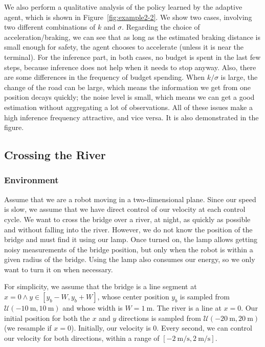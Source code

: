 We also perform a qualitative analysis of the policy learned by the adaptive agent, which is shown in Figure~\ref{fig:example2-2}. We show two cases, involving two different combinations of $k$ and $\sigma$. Regarding the choice of acceleration/braking, we can see that as long as the estimated braking distance is small enough for safety, the agent chooses to accelerate (unless it is near the terminal). For the inference part, in both cases, no budget is spent in the last few steps, because inference does not help when it needs to stop anyway. Also, there are some differences in the frequency of budget spending. When $k/\sigma$ is large, the change of the road can be large, which means the information we get from one position decays quickly; the noise level is small, which means we can get a good estimation without aggregating a lot of observations. All of these issues make a high inference frequency attractive, and vice versa. It is also demonstrated in the figure.

\subsection{Crossing the River}\label{ap:crossing-river}

\subsubsection{Environment} Assume that we are a robot moving in a two-dimensional plane. Since our speed is slow, we assume that we have direct control of our velocity at each control cycle. We want to cross the bridge over a river, at night, as quickly as possible and without falling into the river. However, we do not know the position of the bridge and must find it using our lamp. Once turned on, the lamp allows getting noisy measurements of the bridge position, but only when the robot is within a given radius of the bridge. Using the lamp also consumes our energy, so we only want to turn it on when necessary.

For simplicity, we assume that the bridge is a line segment at $x=0 \wedge y\in [y_b - W, y_b + W]$, whose center position $y_b$ is sampled from $\mathcal{U}(\qty{-10}{\meter}, \qty{10}{\meter})$ and whose width is $W=\qty{1}{\meter}$. The river is a line at $x=0$. Our initial position for both the $x$ and $y$ directions is sampled from $\mathcal{U}(\qty{-20}{\meter}, \qty{20}{\meter})$ (we resample if $x=0$). Initially, our velocity is 0. Every second, we can control our velocity for both directions, within a range of $[\qty{-2}{\meter\per\second}, \qty{2}{\meter\per\second}]$.

